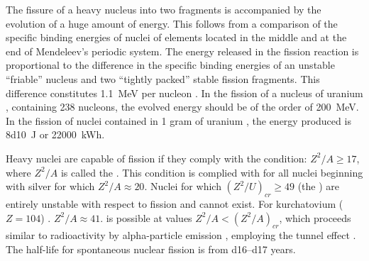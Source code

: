 The fissure of a heavy nucleus into two fragments is accompanied by the evolution of a huge amount of energy. This follows from a comparison of the specific binding energies of nuclei of elements located in the middle and at the end of Mendeleev's periodic system. The energy released in the fission reaction is proportional to the difference in the specific binding energies of an unstable ``friable'' nucleus and two ``tightly packed'' stable fission fragments. This difference constitutes \SI{1.1}{\MeV} per nucleon
. In the fission of a nucleus of uranium , containing 238 nucleons, the evolved energy should be of the order of  \SI{200}{\MeV}. In the fission of nuclei contained in 1 gram of uranium , the energy produced is \SI{8d10}{\joule} or \SI{22000}{\kWh}.


Heavy nuclei are capable of fission if they comply with the
condition: $Z^{2}/A \geqslant 17$, where $Z^{2}/A$ is called the . This condition is complied with for all nuclei beginning with silver   for which $Z^{2}/A \approx 20$. Nuclei for which $(Z^{2}/U)_{cr} \geqslant 49$  (the ) are entirely unstable with respect to fission and cannot exist. For kurchatovium ($Z = 104$) . $Z^{2}/A \approx 41$.  is possible at values $Z^{2}/A < (Z^{2}/A)_{cr}$, which proceeds similar to radioactivity by alpha-particle emission , employing the tunnel effect
. The half-life  for spontaneous nuclear fission is from \numrange{d16}{d17} years.

